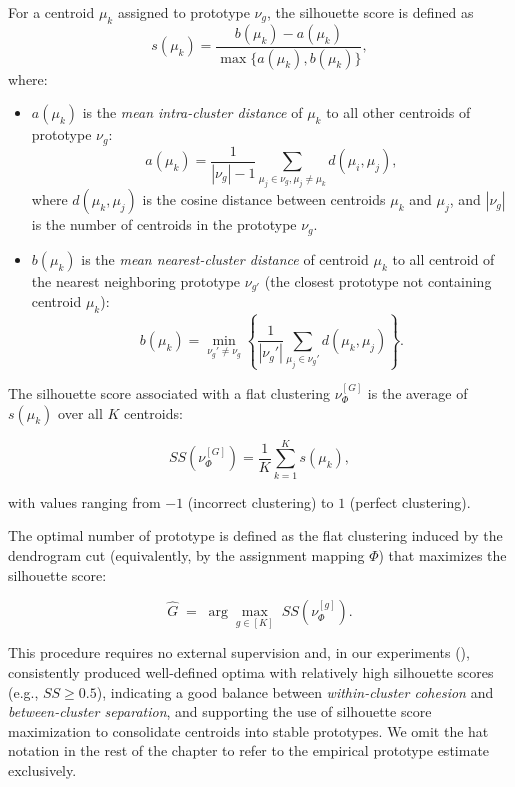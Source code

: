             For a centroid $\mu_k$ assigned to prototype $\nu_g$, the silhouette score is defined as
            \[
                s(\mu_k) = \frac{b(\mu_k) - a(\mu_k)}{\max\{a(\mu_k), b(\mu_k)\}},
            \]
            where:
            \begin{itemize}
                \item \(a(\mu_k)\) is the \emph{mean intra-cluster distance} of \(\mu_k\) to all other centroids of prototype \(\nu_g\):
                \[
                    a(\mu_k) = \frac{1}{|\nu_g| - 1} \sum_{\mu_j \in \nu_g, \mu_j \neq \mu_k} d(\mu_i, \mu_j),
                \]
                where \(d(\mu_k, \mu_j)\) is the cosine distance between centroids \(\mu_k\) and \(\mu_j\), and \(|\nu_g|\) is the number of centroids in the prototype \(\nu_g\).
                
                \item \(b(\mu_k)\) is the \emph{mean nearest-cluster distance} of centroid \(\mu_k\) to all centroid of the nearest neighboring prototype \(\nu_{g'}\) (the closest prototype not containing centroid \(\mu_k\)):
                \[
                    b(\mu_k) = \min_{\nu_g' \neq \nu_g} \left\{ \frac{1}{|\nu_g'|} \sum_{\mu_j \in \nu_g'} d(\mu_k, \mu_j) \right\}.
                \]
            \end{itemize}
            The silhouette score associated with a flat clustering $\nu^{[G]}_\Phi$ is the average of \(s(\mu_k)\) over all $K$ centroids:

            $$SS(\nu^{[G]}_\Phi) = \frac{1}{K} \sum_{k=1}^K s(\mu_k),$$
                
            with values ranging from \(-1\) (incorrect clustering) to \(1\) (perfect clustering).

            The optimal number of prototype is defined as the flat clustering induced by the dendrogram cut (equivalently, by the assignment mapping $\Phi$) that maximizes the silhouette score:

            \[
            \hat{G} \;=\; \arg \max_{g \in [K]} \; SS(\nu^{[g]}_\Phi).
            \]

            This procedure requires no external supervision and, in our experiments (), consistently produced well-defined optima with relatively high silhouette scores (e.g., $SS \geq 0.5$), indicating a good balance between \emph{within-cluster cohesion} and \emph{between-cluster separation}, and supporting the use of silhouette score maximization to consolidate centroids into stable prototypes. We omit the hat notation in the rest of the chapter to refer to the empirical prototype estimate exclusively.

